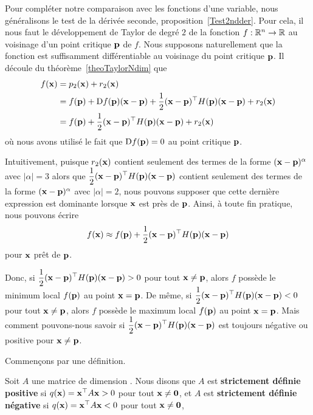 {Pour compléter notre comparaison avec les fonctions d'une variable, nous
généralisons le test de la dérivée seconde,
proposition~\ref{Test2ndder}.   Pour cela, il nous faut le
développement de Taylor de degré $2$ de la fonction $f:\mathbb{R}^n \to \mathbb{R}$
au voisinage d'un point critique $\mathbf{p}$ de $f$.  Nous supposons
naturellement que la fonction est suffisamment différentiable au
voisinage du point critique $\mathbf{p}$.  Il découle du
théorème~\ref{theoTaylorNdim} que
\begin{align*}
f(\mathbf{x}) &= p_2(\mathbf{x})  + r_2(\mathbf{x}) \\
&= f(\mathbf{p}) + \mathrm{D} f(\mathbf{p}) (\mathbf{x} - \mathbf{p}) +
  \frac{1}{2} (\mathbf{x} - \mathbf{p})^\top H(\mathbf{p}) (\mathbf{x} - \mathbf{p})
  + r_2(\mathbf{x}) \\
&= f(\mathbf{p})
  + \frac{1}{2} (\mathbf{x} - \mathbf{p})^\top H(\mathbf{p}) (\mathbf{x} - \mathbf{p})
  + r_2(\mathbf{x})
\end{align*}
où nous avons utilisé le fait que  $\mathrm{D} f(\mathbf{p}) = 0$ au
point critique $\mathbf{p}$.

Intuitivement, puisque $r_2(\mathbf{x})$ contient seulement des termes de
la forme $(\mathbf{x} - \mathbf{p})^{\alpha}$ avec $|\alpha| = 3$ alors que
$\displaystyle \frac{1}{2} (\mathbf{x} - \mathbf{p})^\top H(\mathbf{p}) 
(\mathbf{x} - \mathbf{p})$ contient seulement des termes de la forme
$(\mathbf{x} - \mathbf{p})^{\alpha}$ avec $|\alpha| = 2$, nous pouvons supposer
que cette dernière expression est dominante lorsque $\mathbf{x}$ est près
de $\mathbf{p}$.  Ainsi, à toute fin pratique, nous pouvons écrire
\[
  f(\mathbf{x}) \approx f(\mathbf{p}) + \frac{1}{2} (\mathbf{x} - \mathbf{p})^\top
  H(\mathbf{p})(\mathbf{x} - \mathbf{p}) 
\]
pour $\mathbf{x}$ prêt de $\mathbf{p}$.

Donc, si $\displaystyle \frac{1}{2} (\mathbf{x} - \mathbf{p})^\top H(\mathbf{p})
(\mathbf{x} - \mathbf{p}) > 0$ pour tout $\mathbf{x} \neq \mathbf{p}$, alors
$f$ possède le minimum local $f(\mathbf{p})$ au point
$\mathbf{x} = \mathbf{p}$.  De même, si
$\displaystyle \frac{1}{2} (\mathbf{x} - \mathbf{p})^\top H(\mathbf{p})
(\mathbf{x} - \mathbf{p}) < 0$ pour tout $\mathbf{x} \neq \mathbf{p}$, alors
$f$ possède le maximum local $f(\mathbf{p})$ au point
$\mathbf{x} = \mathbf{p}$.  Mais comment pouvons-nous savoir si 
$\displaystyle \frac{1}{2} (\mathbf{x} - \mathbf{p})^\top H(\mathbf{p})
(\mathbf{x} - \mathbf{p})$ est toujours négative ou positive pour
$\mathbf{x} \neq \mathbf{p}$.

Commençons par une définition.

\begin{defn}
Soit $A$ une matrice de dimension .  Nous disons que $A$ est 
{\bfseries strictement définie positive} si
$q(\mathbf{x}) = \mathbf{x}^\top A \mathbf{x} > 0$ pour tout $\mathbf{x} \neq \mathbf{0}$, et
$A$ est {\bfseries strictement définie négative} si
$q(\mathbf{x}) = \mathbf{x}^\top A \mathbf{x} < 0$ pour tout $\mathbf{x} \neq \mathbf{0}$,
\end{defn}

}
